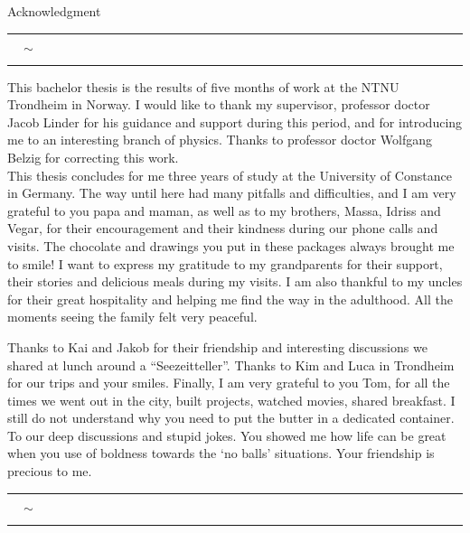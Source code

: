 \documentclass[../main.tex]{subfile}
\begin{document}
\thispagestyle{empty}
\vspace*{24pt}
\begin{center}
    \LARGE Acknowledgment \normalsize\vspace{24pt}\\
    \rule[3pt]{0.04\textwidth}{0.2pt} $\quad\sim\quad$\rule[3pt]{.04\textwidth}{0.2pt} 
\end{center}
\vspace*{36pt}


This bachelor thesis is the results of five months of work at the NTNU Trondheim in Norway. I would like to thank my supervisor, professor doctor Jacob Linder
for his guidance and support during this period, and for introducing me to an interesting branch of physics. Thanks to professor doctor Wolfgang Belzig for 
correcting this work.\\

This thesis concludes for me three years of study at the University of Constance in Germany. The way until here had many pitfalls and difficulties, and I am very grateful to 
you papa and maman, as well as to my brothers, Massa, Idriss and Vegar, for their encouragement and their kindness during our phone calls and visits. The chocolate and drawings you put in these packages
always brought me to smile! I want to express my gratitude to my grandparents for their support, their stories and delicious meals during my visits. I am also thankful
to my uncles for their great hospitality and helping me find the way in the adulthood. All the moments seeing the family felt very peaceful.

Thanks to Kai and Jakob for their friendship and interesting discussions we shared at lunch around a ``Seezeitteller''. Thanks to Kim and Luca 
in Trondheim for our trips and your smiles. Finally, I am very grateful to you Tom, for all the times we went out in the city, built projects,
watched movies, shared breakfast. I still do not understand why you need to put the butter in a dedicated container. 
To our deep discussions and stupid jokes. You showed me how life can be great when you use of boldness towards the `no balls' situations.
Your friendship is precious to me.

\begin{center}
    \rule{0.1\textwidth}{0.2pt} $\quad\sim\quad$\rule{0.1\textwidth}{0.2pt} 
\end{center}
\end{document}
